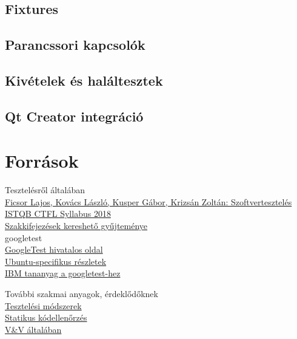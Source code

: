 \documentclass[usenames,dvipsnames,aspectratio=169]{beamer}
\newcommand{\hiv}[1]{{\color{hivatkozasszin}#1}}
\begin{document}
\subsection{Fixtures}


\subsection{Parancssori kapcsolók}


\subsection{Kivételek és haláltesztek}


\subsection{Qt Creator integráció}


\section[Forr.]{Források}

\begin{frame}
  Tesztelésről általában\\
  \hiv{\href{https://www.tankonyvtar.hu/hu/tartalom/tamop425/0046\_szoftverteszteles/index.html}%
  {Ficsor Lajos, Kovács László, Kusper Gábor, Krizsán Zoltán: Szoftvertesztelés}}\\
  \hiv{\href{https://hstqb.org/downloadarea/istqb-ctfl-syllabus-2018-magyar/}{ISTQB CTFL Syllabus 2018}}\\
  \hiv{\href{https://glossary.istqb.org/en/search/}{Szakkifejezések kereshető gyűjteménye}}\\
  \vfill
  googletest\\
  \hiv{\href{http://google.github.io/googletest/}%
    {GoogleTest hivatalos oldal}}\\
  \hiv{\href{https://www.eriksmistad.no/getting-started-with-google-test-on-ubuntu/}%
    {Ubuntu-specifikus részletek}}\\
  \hiv{\href{https://developer.ibm.com/articles/au-googletestingframework/}{IBM tananyag a googletest-hez}}\\
\end{frame}

\begin{frame}
  További szakmai anyagok, érdeklődőknek\\
  \vfill
  \hiv{\href{http://inf.mit.bme.hu/sites/default/files/materials/category/kateg\%C3\%B3ria/education/software-and-systems-verification/18/04-SWSV-testing-overview.pdf}%
  {Tesztelési módszerek}}\\
  \hiv{\href{http://inf.mit.bme.hu/sites/default/files/materials/category/kateg\%C3\%B3ria/education/software-and-systems-verification/18/03-SWSV-verifying-source-code.pdf}{Statikus kódellenőrzés}}\\
  \hiv{\href{http://inf.mit.bme.hu/sites/default/files/materials/category/kateg\%C3\%B3ria/education/software-and-systems-verification/18/02-SWSV-overview-of-vv-techniques.pdf}{V\&V általában}}\\
\end{frame}
\end{document}
